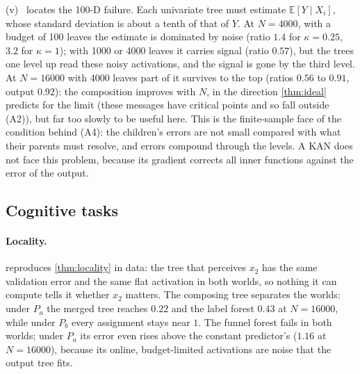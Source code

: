 \documentclass[11pt]{article}
\theoremstyle{definition}
\theoremstyle{remark}
\newcommand{\E}{\mathbb{E}}
\begin{document}
(v)~ locates the 100-D failure.  Each univariate tree must estimate
$\E[Y\mid X_i]$, whose standard deviation is about a tenth of that of $Y$.  At $N=4000$, with a budget
of 100 leaves the estimate is dominated by noise (ratio $1.4$ for $\kappa=0.25$, $3.2$ for
$\kappa=1$); with 1000 or 4000 leaves it carries signal (ratio $0.57$), but the trees one
level up read these noisy activations, and the signal is gone by the third level.  At $N=16000$ with 4000 leaves part of
it survives to the top (ratios $0.56$ to $0.91$, output $0.92$): the composition improves
with $N$, in the direction \cref{thm:ideal} predicts for the limit (these messages have
critical points and so fall outside (A2)), but far too slowly to be useful here.  This is the finite-sample face of the
condition behind (A4): the children's errors are not small compared with what their
parents must resolve, and errors compound through the levels.  A KAN does not face this
problem, because its gradient corrects all inner functions against the error of the
output.

\subsection{Cognitive tasks}\label{sec:exp-tasks}

\begin{table}[t]
\centering\small

\caption{The two sign worlds of \cref{thm:locality} (five seeds).  Left: a tree that
perceives $x_2$ and predicts $Y$---its validation RMSE equals that of the constant
predictor ($1.00$) and its activation is flat in both worlds.  Right: the composing
tree's test RMSE for four task assignments.}
\label{tab:locality}
\end{table}

\paragraph{Locality.}
 reproduces \cref{thm:locality} in data: the tree that perceives $x_2$
has the same validation error and the same flat activation in both worlds, so nothing
it can compute tells it whether $x_2$ matters.  The composing tree separates the worlds:
under $P_a$ the merged tree reaches $0.22$ and the label forest $0.43$ at $N=16000$, while
under $P_b$ every assignment stays near $1$.  The funnel forest fails in both worlds; under
$P_a$ its error even rises above the constant predictor's ($1.16$ at $N=16000$), because
its online, budget-limited activations are noise that the output tree fits.
\end{document}
